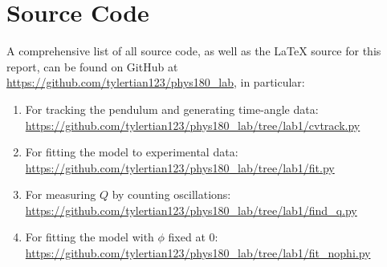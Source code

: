 \documentclass[aps,twocolumn,secnumarabic,nobalancelastpage,amsmath,amssymb,nofootinbib]{revtex4}
\begin{document}

\appendix
\section{Source Code}

A comprehensive list of all source code, as well as the \LaTeX{} source for this report, can be found on GitHub at
\url{https://github.com/tylertian123/phys180_lab}, in particular:
\label{appendix:code}
\begin{enumerate}
    \item For tracking the pendulum and generating time-angle data: \url{https://github.com/tylertian123/phys180_lab/tree/lab1/cvtrack.py}
    \item For fitting the model to experimental data: \url{https://github.com/tylertian123/phys180_lab/tree/lab1/fit.py}
    \item For measuring \(Q\) by counting oscillations: \url{https://github.com/tylertian123/phys180_lab/tree/lab1/find_q.py}
    \item For fitting the model with \(\phi\) fixed at 0: \url{https://github.com/tylertian123/phys180_lab/tree/lab1/fit_nophi.py}
\end{enumerate}
\end{document}
